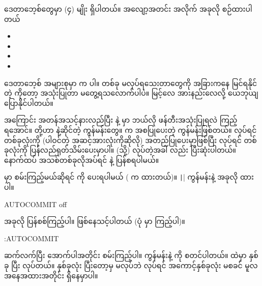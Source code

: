 \begin{mytcboxflt}
ဒေတာဘေ့စ်တွေမှာ  (၄) မျိုး ရှိပါတယ်။  အလျော့အတင်း အလိုက်  အခုလို စဉ်ထားပါတယ်
%
\vspace{0.5\baselineskip}
\begin{itemize}
    \setlength\itemsep{0.25em}
    \item {}
    \item {}
    \item {}
    \item {}
\end{itemize}
\vspace{0.5\baselineskip}
%
ဒေတာဘေ့စ် အများစုမှာ  က  ပါ။  တစ်ခု  မလုပ်ရသေးတာတွေကို အခြားကနေ မြင်ရနိုင်တဲ့  ကိုတော့ အသုံးပြုတာ မတွေ့ရသလောက်ပါပဲ။  မြင့်လေ   အားနည်းလေလို့ ယေဘုယျ ပြောနိုင်ပါတယ်။   
\end{mytcboxflt}

 အကြောင်း အတန်အသင့်နားလည်ပြီး  နဲ့  မှာ ဘယ်လို ဖန်တီးအသုံးပြုရလဲ ကြည့်ရအောင်။ \fEn{,} \fEn{,}  တို့ဟာ  နဲ့ဆိုင်တဲ့  ကွန်မန်းတွေ။  က  အစပြုပေးတဲ့ ကွန်မန်းဖြစ်တယ်။  လုပ်ရင်  တစ်ခုလုံးကို (ပါဝင်တဲ့ အဆင့်အားလုံးကိုဆိုလို) အတည်ပြုပေးမှာဖြစ်ပြီး  လုပ်ရင်  တစ်ခုလုံးကို ပြန်လည်ရုတ်သိမ်းပေးမှာပါ။  (သို့)  လုပ်တဲ့အခါ  လည်း ပြီးဆုံးပါတယ်။ နောက်ထပ် အသစ်တစ်ခုလိုအပ်ရင်  နဲ့ ပြန်စရပါမယ်။  

 မှာ စမ်းကြည့်မယ်ဆိုရင်  ကို  ပေးရပါမယ် ( က  ထားတယ်)။ \texttt|\set| ကွန်မန်းနဲ့ အခုလို  ထားပါ။
%
\begin{codetxt}
\set AUTOCOMMIT off
\end{codetxt}
%
အခုလို ပြန်စစ်ကြည့်ပါ။  ဖြစ်နေသင့်ပါတယ် (ပုံ \fRefNo{\ref{fig:tx}} မှာ ကြည့်ပါ)။
\begin{codetxt}
\echo :AUTOCOMMIT
\end{codetxt}

ဆက်လက်ပြီး အောက်ပါအတိုင်း စမ်းကြည့်ပါ။  ကွန်မန်းနဲ့  ကို စတင်ပါတယ်။  ထဲမှာ  နှစ်ခု  ပြီး  လုပ်တယ်။  နှစ်ခုလုံး  ပြီးတော့မှ  မလုပ်ဘဲ  လုပ်ရင် အကောင့်နှစ်ခုလုံး  မစခင် မူလအနေအထားအတိုင်း ရှိနေမှာပါ။ 

